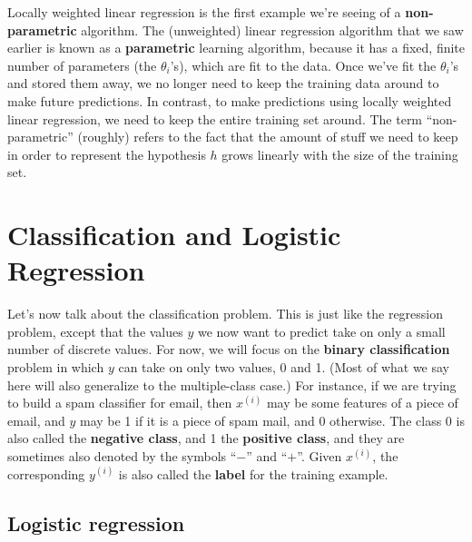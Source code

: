 Locally weighted linear regression is the first example we're seeing of a
\textbf{non-parametric} algorithm. The (unweighted) linear regression algorithm
that we saw earlier is known as a \textbf{parametric} learning algorithm, because
it has a fixed, finite number of parameters (the $\theta_i$'s), which are fit to the
data. Once we've fit the $\theta_i$'s and stored them away, we no longer need to
keep the training data around to make future predictions. In contrast, to
make predictions using locally weighted linear regression, we need to keep
the entire training set around. The term ``non-parametric'' (roughly) refers
to the fact that the amount of stuff we need to keep in order to represent the
hypothesis $h$ grows linearly with the size of the training set.



\chapter{Classification and Logistic Regression}
\label{cha:classification_logistic_regression}

Let's now talk about the classification problem. This is just like the regression
problem, except that the values $y$ we now want to predict take on only
a small number of discrete values. For now, we will focus on the \textbf{binary
classification} problem in which $y$ can take on only two values, 0 and 1.
(Most of what we say here will also generalize to the multiple-class case.)
For instance, if we are trying to build a spam classifier for email, then $x^{(i)}$
may be some features of a piece of email, and $y$ may be 1 if it is a piece
of spam mail, and 0 otherwise. The class 0 is also called the \textbf{negative class}, and 1 %
the \textbf{positive class}, and they are sometimes also denoted by the symbols ``$-$''
and ``$+$''. Given $x^{(i)}$, the corresponding $y^{(i)}$ is also called the \textbf{label} for the
training example.

\section{Logistic regression} %

\titlespacing*{\part}{0pt}{50pt}{40pt} %
\titlespacing*{\chapter}{0pt}{50pt}{40pt} %

